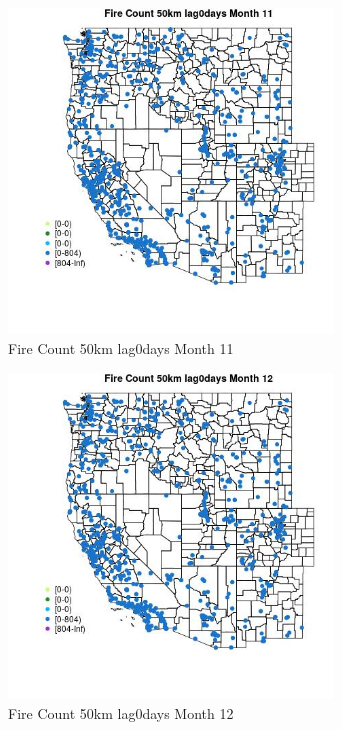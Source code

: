 \begin{figure} 
\centering  
\includegraphics[width=0.77\textwidth]{Code_Outputs/Report_ML_input_PM25_Step4_part_f_de_duplicated_aves_prioritize_24hr_obswNAs_MapObsMo11Fire_Count_50km_lag0days.jpg} 
\caption{\label{fig:Report_ML_input_PM25_Step4_part_f_de_duplicated_aves_prioritize_24hr_obswNAsMapObsMo11Fire_Count_50km_lag0days}Fire Count 50km lag0days Month 11} 
\end{figure} 
 

\begin{figure} 
\centering  
\includegraphics[width=0.77\textwidth]{Code_Outputs/Report_ML_input_PM25_Step4_part_f_de_duplicated_aves_prioritize_24hr_obswNAs_MapObsMo12Fire_Count_50km_lag0days.jpg} 
\caption{\label{fig:Report_ML_input_PM25_Step4_part_f_de_duplicated_aves_prioritize_24hr_obswNAsMapObsMo12Fire_Count_50km_lag0days}Fire Count 50km lag0days Month 12} 
\end{figure} 
 

